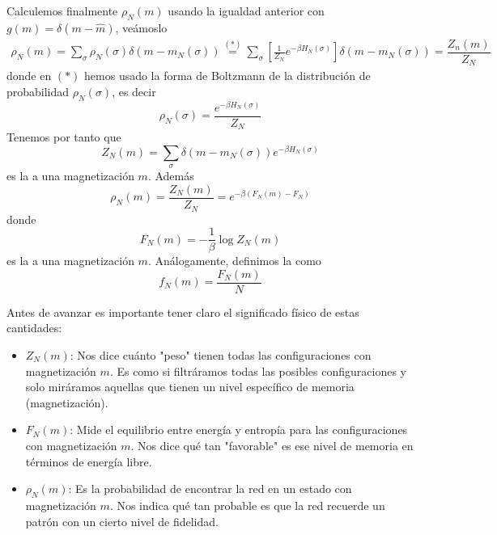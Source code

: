 \noindent
Calculemos finalmente $\rho_N(m)$ usando la igualdad anterior con $g(m) = \delta(m - \hat{m})$, veámoslo
\begin{align*}
    \rho_N(m) = \sum_{\sigma} \rho_N(\sigma) \delta(m - m_N(\sigma))\overset{(*)}{=}\sum_{\sigma} \left[ \frac{1}{Z_N} e^{-\beta H_N(\sigma)} \right] \delta(m - m_N(\sigma))=\dfrac{Z_n(m)}{Z_N}
\end{align*}
donde en $(*)$ hemos usado la forma de Boltzmann de la distribución de probabilidad $\rho_N(\sigma)$, es decir
\begin{equation*}
    \rho_N(\sigma) = \dfrac{e^{-\beta H_N(\sigma)}}{Z_N}
\end{equation*}
Tenemos por tanto que
\begin{equation*}
    Z_N(m) = \sum_{\sigma} \delta(m - m_N(\sigma)) e^{-\beta H_N(\sigma)}
\end{equation*}
es la  a una magnetización $m$. Además
\begin{equation*}
    \rho_N(m) = \dfrac{Z_N(m)}{Z_N} = e^{-\beta (F_N(m) - F_N)}
\end{equation*}
donde 
\begin{equation*}
    F_N(m) = -\frac{1}{\beta} \log Z_N(m)
\end{equation*}
es la  a una magnetización $m$. Análogamente, definimos la  como
\begin{equation*}
    f_N(m) = \frac{F_N(m)}{N}
\end{equation*}

\noindent
Antes de avanzar es importante tener claro el significado físico de estas cantidades:
\begin{itemize}
    \item $Z_N(m)$: Nos dice cuánto "peso" tienen todas las configuraciones con magnetización $m$. Es como si filtráramos todas las posibles configuraciones y solo miráramos aquellas que tienen un nivel específico de memoria (magnetización).
    \item $F_N(m)$: Mide el equilibrio entre energía y entropía para las configuraciones con magnetización $m$. Nos dice qué tan "favorable" es ese nivel de memoria en términos de energía libre.
    \item $\rho_N(m)$: Es la probabilidad de encontrar la red en un estado con magnetización $m$. Nos indica qué tan probable es que la red recuerde un patrón con un cierto nivel de fidelidad.
\end{itemize}

